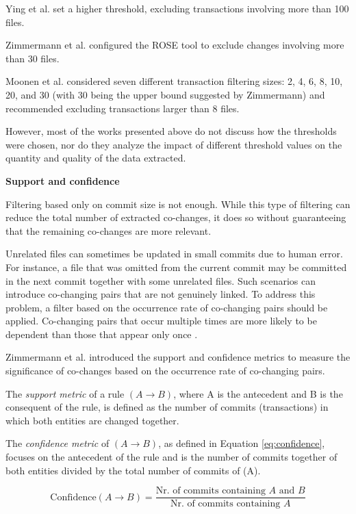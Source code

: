 Ying et al. \cite{Ying-co-change} set a higher threshold, excluding transactions involving more than 100 files.

Zimmermann et al. \cite{Zimmermann:2004:MVH:998675.999460} configured the ROSE tool to exclude changes involving more than 30 files.

Moonen et al. \cite{Moonen-commit} considered seven different transaction filtering sizes: 2, 4, 6, 8, 10, 20, and 30 (with 30 being the upper bound suggested by Zimmermann) and recommended excluding transactions larger than 8 files.

However, most of the works presented above do not discuss how the thresholds were chosen, nor do they analyze the impact of different threshold values on the quantity and quality of the data extracted.


\textbf{Support and confidence}

Filtering based only on commit size is not enough. While this type of filtering can reduce the total number of extracted co-changes, it does so without guaranteeing that the remaining co-changes are more relevant.

Unrelated files can sometimes be updated in small commits due to human error. For instance, a file that was omitted from the current commit may be committed in the next commit together with some unrelated files. Such scenarios can introduce co-changing pairs that are not genuinely linked. To address this problem, a filter based on the occurrence rate of co-changing pairs should be applied. Co-changing pairs that occur multiple times are more likely to be dependent than those that appear only once \cite{b4}.

Zimmermann et al. \cite{Zimmermann:2004:MVH:998675.999460, Zimmermannj2003} introduced the support and confidence metrics to measure the significance of co-changes based on the occurrence rate of co-changing pairs.

The \textit{support metric} of a rule $(A \rightarrow B)$, where A is the antecedent and B is the consequent of the rule, is defined as the number of commits (transactions) in which both entities are changed together.

The \textit{confidence metric} of $(A \rightarrow B)$, as defined in Equation \eqref{eq:confidence}, focuses on the antecedent of the rule and is the number of commits together of both entities divided by the total number of commits of (A).

\begin{equation}
\text{Confidence}(A \rightarrow B) = \frac{\text{Nr. of commits containing } A \text{ and } B}{\text{Nr. of commits containing } A}
\label{eq:confidence}
\end{equation}


